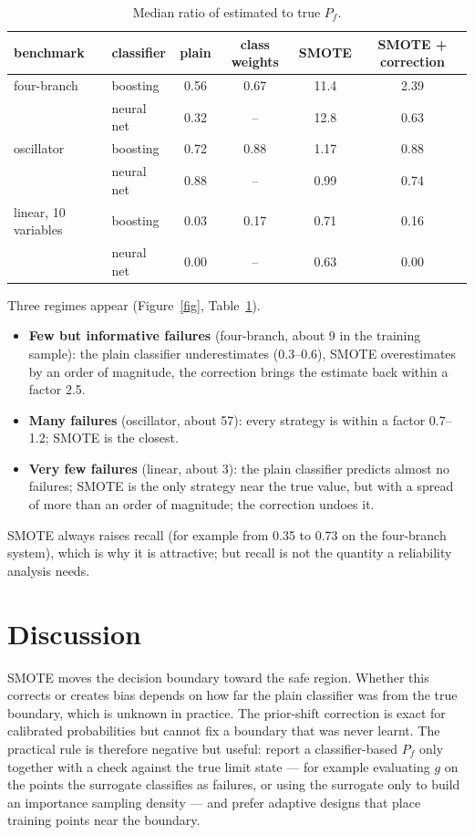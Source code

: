 \documentclass[11pt]{article}
\begin{document}
\begin{table}[h]
\centering
\begin{tabular}{llcccc}
\toprule
benchmark & classifier & plain & class weights & SMOTE & SMOTE + correction \\
\midrule
four-branch & boosting & 0.56 & 0.67 & 11.4 & 2.39 \\
 & neural net & 0.32 & -- & 12.8 & 0.63 \\
oscillator & boosting & 0.72 & 0.88 & 1.17 & 0.88 \\
 & neural net & 0.88 & -- & 0.99 & 0.74 \\
linear, 10 variables & boosting & 0.03 & 0.17 & 0.71 & 0.16 \\
 & neural net & 0.00 & -- & 0.63 & 0.00 \\
\bottomrule
\end{tabular}
\caption{Median ratio of estimated to true $P_f$.}
\label{tab}
\end{table}

Three regimes appear (Figure~\ref{fig}, Table~\ref{tab}).
\begin{itemize}
\item \textbf{Few but informative failures} (four-branch, about 9 in the training sample): the plain classifier
underestimates (0.3--0.6), SMOTE overestimates by an order of magnitude, the correction brings the estimate back
within a factor 2.5.
\item \textbf{Many failures} (oscillator, about 57): every strategy is within a factor 0.7--1.2; SMOTE is the closest.
\item \textbf{Very few failures} (linear, about 3): the plain classifier predicts almost no failures; SMOTE is the
only strategy near the true value, but with a spread of more than an order of magnitude; the correction undoes it.
\end{itemize}
SMOTE always raises recall (for example from 0.35 to 0.73 on the four-branch system), which is why it is attractive;
but recall is not the quantity a reliability analysis needs.

\section{Discussion}
SMOTE moves the decision boundary toward the safe region. Whether this corrects or creates bias depends on how far
the plain classifier was from the true boundary, which is unknown in practice. The prior-shift correction is exact for
calibrated probabilities but cannot fix a boundary that was never learnt. The practical rule is therefore negative but
useful: report a classifier-based $P_f$ only together with a check against the true limit state --- for example
evaluating $g$ on the points the surrogate classifies as failures, or using the surrogate only to build an importance
sampling density --- and prefer adaptive designs that place training points near the boundary.
\end{document}
